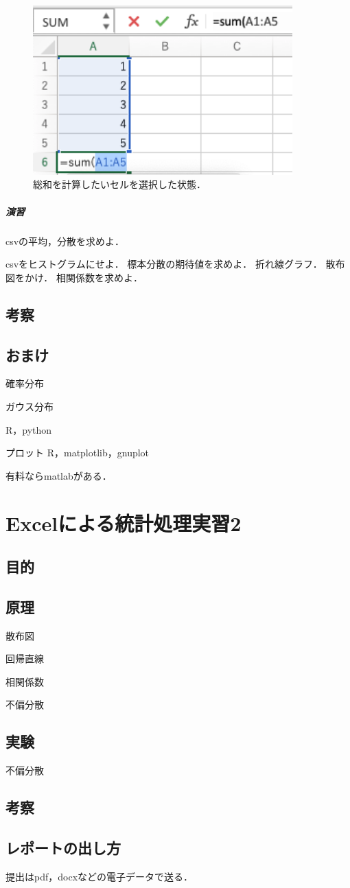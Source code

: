 \documentclass[12pt, a4j]{jreport}
\begin{document}
\begin{figure}[htbp]
  \includegraphics[width=10cm]{sum.png}
  \caption{総和を計算したいセルを選択した状態．}
  \label{fig:sum}
\end{figure}


\paragraph{演習}
csvの平均，分散を求めよ．

csvをヒストグラムにせよ．
標本分散の期待値を求めよ．
折れ線グラフ．
散布図をかけ．
相関係数を求めよ．

\section{考察}


\section{おまけ}

確率分布

ガウス分布

R，python

プロット
R，matplotlib，gnuplot


有料ならmatlabがある．

\chapter{Excelによる統計処理実習2}

\section{目的}

\section{原理}

散布図

回帰直線

相関係数

不偏分散

\section{実験}

不偏分散

\section{考察}


\section{レポートの出し方}

提出はpdf，docxなどの電子データで送る．
\end{document}
